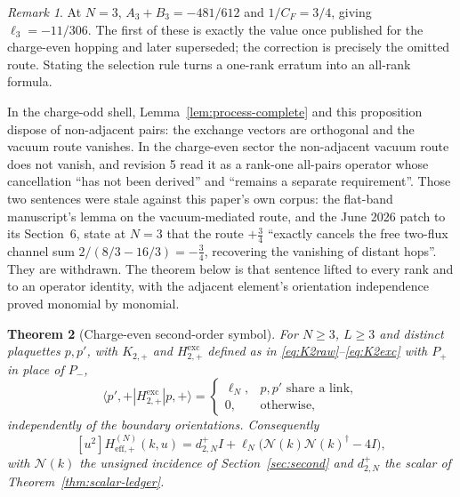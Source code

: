 \documentclass[11pt]{article}
\theoremstyle{plain}
\newtheorem{theorem}{Theorem}
\theoremstyle{definition}
\theoremstyle{remark}
\newtheorem{remark}[theorem]{Remark}
\newcommand{\chk}[1]{}
\newcommand{\CF}{C_F}
\newcommand{\dg}{^{\dagger}}
\begin{document}
\begin{remark}
At $N=3$, $A_3+B_3=-481/612$ and $1/\CF=3/4$, giving $\ell_3=-11/306$. The
first of these is exactly the value once published for the charge-even hopping
and later superseded; the correction is precisely the omitted route. Stating
the selection rule turns a one-rank erratum into an all-rank formula.

In the charge-odd shell, Lemma~\ref{lem:process-complete} and this proposition
dispose of non-adjacent pairs: the exchange vectors are orthogonal and the
vacuum route vanishes. In the charge-even sector the non-adjacent vacuum route
does not vanish, and revision 5 read it as a rank-one all-pairs operator whose
cancellation ``has not been derived'' and ``remains a separate requirement''.
Those two sentences were stale against this paper's own corpus: the flat-band
manuscript's lemma on the vacuum-mediated route, and the June 2026 patch to
its Section~6, state at $N=3$ that the route $+\tfrac34$ ``exactly cancels the
free two-flux channel sum $2/(8/3-16/3)=-\tfrac34$, recovering the vanishing
of distant hops''. They are withdrawn. The theorem below is that sentence
lifted to every rank and to an operator identity, with the adjacent element's
orientation independence proved monomial by monomial.
\chk{FINDING: revision 5 called the charge-even vacuum-route cancellation underived; the pinned corpus proves it for distant pairs at N = 3}
\end{remark}

\begin{theorem}[Charge-even second-order symbol]\label{thm:even-symbol}
For $N\ge3$, $L\ge3$ and distinct plaquettes $p,p'$, with $K_{2,+}$ and
$H^{\mathrm{exc}}_{2,+}$ defined as in \eqref{eq:K2raw}--\eqref{eq:K2exc}
with $P_+$ in place of $P_-$,
\[
 \langle p',+|H^{\mathrm{exc}}_{2,+}|p,+\rangle=
 \begin{cases}\ell_N,& p,p'\text{ share a link},\\ 0,& \text{otherwise},\end{cases}
\]
independently of the boundary orientations. Consequently
\[
 [u^2]H^{(N)}_{\mathrm{eff},+}(k,u)
 =d^+_{2,N}I+\ell_N\bigl(\mathcal N(k)\mathcal N(k)\dg-4I\bigr),
\]
with $\mathcal N(k)$ the unsigned incidence of Section~\ref{sec:second} and
$d^+_{2,N}$ the scalar of Theorem~\ref{thm:scalar-ledger}.
\end{theorem}
\end{document}
